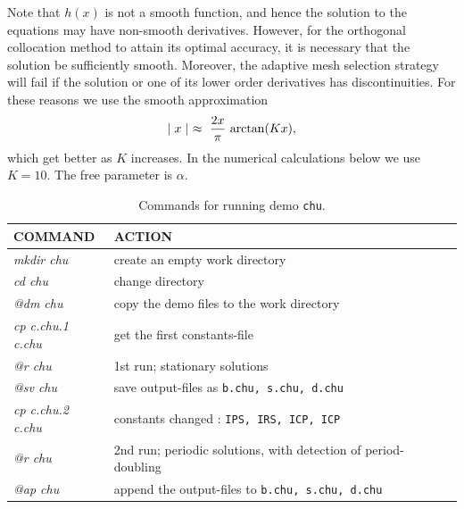 \documentclass[12pt]{report}
\def\abs#1{\mid#1\mid}
\begin{document}
Note that $h(x)$ is not a smooth function, and hence the solution 
to the equations  may have non-smooth derivatives.
However, for the orthogonal collocation method to attain its optimal accuracy,
it is necessary that the solution be sufficiently smooth.
Moreover, the adaptive mesh selection strategy will fail
if the solution or one of its lower order derivatives has discontinuities.
For these reasons  we use the smooth approximation
$$ \abs{x} ~\approx~ \frac{2 x}{\pi} ~ {\rm arctan}(Kx),$$
which get better as $K$ increases.
In the numerical calculations below we use $K = 10$.
The free parameter is $\alpha$.


\begin{table}[htbp]
\begin{center}
\begin{tabular}{| l | l |}
\hline
  COMMAND  & ACTION \\
\hline
  {\it mkdir chu} & create an empty work directory \\ 
  {\it cd chu} & change directory \\
  {\it @dm chu} & copy the demo files to the work directory \\
\hline
  {\it cp c.chu.1 c.chu} & get the first constants-file \\ 
  {\it @r chu} & 1st run; stationary solutions \\ 
  {\it @sv chu} & save output-files as {\tt b.chu, s.chu, d.chu} \\ 
\hline
  {\it cp c.chu.2 c.chu} & constants changed : {\tt IPS, IRS, ICP, ICP} \\ 
  {\it @r chu} & 2nd run; periodic solutions, with detection of period-doubling \\ 
  {\it @ap chu} & append the output-files to {\tt b.chu, s.chu, d.chu} \\ 
\hline
\end{tabular}
\caption{Commands for running demo {\tt chu}.}
\label{tbl:demo_chu}
\end{center}
\end{table}

\newpage
\end{document}
